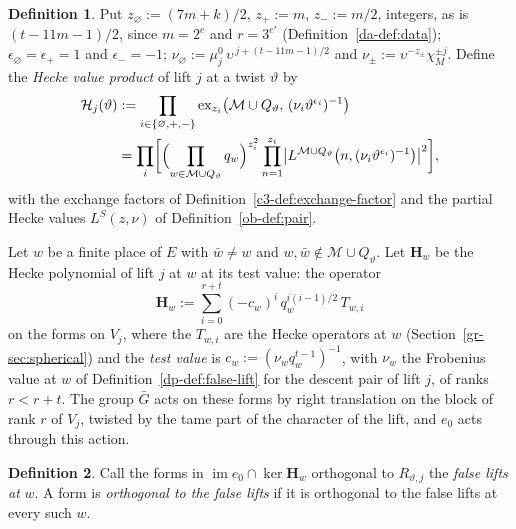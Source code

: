 \documentclass[reqno]{amsart}
\theoremstyle{definition}
\newtheorem{definition}{Definition}[section]
\theoremstyle{plain}
\theoremstyle{remark}
\newcommand{\Hc}{{\mathcal{H}}}
\newcommand{\Mch}{{\mathcal{M}}}
\newcommand{\Hb}{{\mathbf{H}}}
\newcommand{\im}{\operatorname{im}}
\newcommand{\ex}{\mathrm{ex}}
\begin{document}
\begin{definition}\label{def:hecke-product}
Put \(z_\varnothing := (7m + k)/2\), \(z_+ := m\), \(z_- := m/2\), integers, as is \((t - 11m - 1)/2\), since \(m = 2^e\) and \(r = 3^{e'}\) (Definition~\ref{da-def:data}); \(\epsilon_\varnothing = \epsilon_+ = 1\) and \(\epsilon_- = -1\); \(\nu_\varnothing := \mu_j^0\,\upsilon^{\,j + (t - 11m - 1)/2}\) and \(\nu_\pm := \upsilon^{-z_\pm}\chi_M^{\pm j}\).  Define the \emph{Hecke value product} of lift \(j\) at a twist \(\vartheta\) by
\begin{align*}
  \Hc_j(\vartheta) &:= \prod_{i \in \{\varnothing, +, -\}} \ex_{z_i}\bigl(\Mch \cup Q_\vartheta,\, (\nu_i\vartheta^{\epsilon_i})^{-1}\bigr) \\
  &= \prod_{i} \biggl[\Bigl(\prod_{w \in \Mch \cup Q_\vartheta} q_w\Bigr)^{z_i^2} \prod_{n=1}^{z_i} \bigl\lvert L^{\Mch \cup Q_\vartheta}\bigl(n, (\nu_i\vartheta^{\epsilon_i})^{-1}\bigr)\bigr\rvert^2\biggr] ,
\end{align*}
with the exchange factors of Definition~\ref{c3-def:exchange-factor} and the partial Hecke values \(L^S(z,\nu)\) of Definition~\ref{ob-def:pair}.
\end{definition}

Let \(w\) be a finite place of \(E\) with \(\bar w \ne w\) and \(w, \bar w \notin \Mch \cup Q_\vartheta\).  Let \(\Hb_w\) be the Hecke polynomial of lift \(j\) at \(w\) at its test value: the operator
\[
  \Hb_w := \sum_{i=0}^{r+t} (-c_w)^i\, q_w^{i(i-1)/2}\, T_{w,i}
\]
on the forms on \(V_j\), where the \(T_{w,i}\) are the Hecke operators at \(w\) (Section~\ref{gr-sec:spherical}) and the \emph{test value} is \(c_w := (\nu_w q_w^{t-1})^{-1}\), with \(\nu_w\) the Frobenius value at \(w\) of Definition~\ref{dp-def:false-lift} for the descent pair of lift \(j\), of ranks \(r < r + t\).  The group \(\bar G\) acts on these forms by right translation on the block of rank \(r\) of \(V_j\), twisted by the tame part of the character of the lift, and \(e_0\) acts through this action.

\begin{definition}\label{def:false}
Call the forms in \(\im e_0 \cap \ker \Hb_w\) orthogonal to \(R_{\vartheta,j}\) the \emph{false lifts at} \(w\).  A form is \emph{orthogonal to the false lifts} if it is orthogonal to the false lifts at every such \(w\).
\end{definition}
\end{document}
